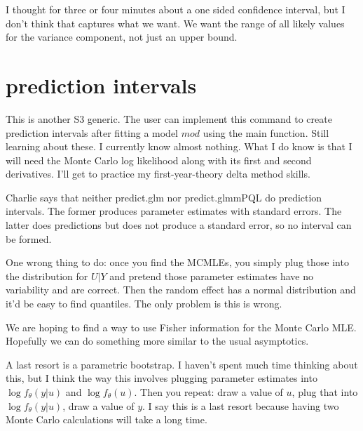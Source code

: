 \documentclass{article}
\begin{document}
I thought for three or four minutes about a one sided confidence interval, but I don't think that captures what we want. We want the range of all likely values for the variance component, not just an upper bound.


\section{prediction intervals}
This is another S3 generic. The user can implement this command to create prediction intervals after  fitting a model $mod$ using the main function. Still learning about these. I currently know almost nothing. What I do know is that I will need the Monte Carlo log likelihood along with its first and second derivatives. I'll get to practice my first-year-theory delta method skills.

Charlie says that neither predict.glm nor predict.glmmPQL do prediction intervals. The former produces parameter estimates with standard errors. The latter does predictions but does not produce a standard error, so no interval can be formed.

One wrong thing to do: once you find the MCMLEs, you simply plug those into the distribution for $U|Y$ and pretend those parameter estimates have no variability and are  correct. Then the random effect has a normal distribution and it'd be easy to find quantiles. The only problem is this is wrong.

We are hoping to find a way to use Fisher information for the Monte Carlo MLE. Hopefully we can do something more similar to the usual asymptotics.

A last resort is a parametric bootstrap. I haven't spent much time thinking about this, but I think the way this involves plugging parameter estimates  into $\log f_\theta(y|u)$ and $\log f_\theta(u)$. Then you repeat: draw a value of $u$, plug that into $\log f_\theta(y|u)$, draw a value of $y$. I say this is a last resort  because having two Monte Carlo calculations will take a long time. 
\end{document}
